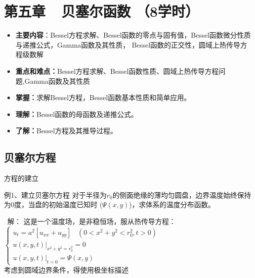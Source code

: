 
\renewcommand{\thechapter}{}
\chapter{第五章~~贝塞尔函数 （8学时）}
\renewcommand{\thechapter}{5}

\begin{itemize}
\item \textbf{主要内容}：Bessel方程求解、Bessel函数的零点与固有值，Bessel函数微分性质与递推公式，Gamma函数及其性质， Bessel函数的正交性，圆域上热传导方程级数解
\item \textbf{重点和难点：}Bessel方程求解、Bessel函数性质、圆域上热传导方程问题,Gamma函数及其性质
\item \textbf{掌握：}求解Bessel方程，Bessel函数基本性质和简单应用。
\item \textbf{理解：}Bessel函数的母函数及递推公式。
\item \textbf{了解：}Bessel方程及其推导过程。
\end{itemize}

\section{贝塞尔方程}


	{方程的建立}
	\begin{example} {例1、建立贝塞尔方程}
		对于半径为$r_0$的侧面绝缘的薄均匀圆盘，边界温度始终保持为0度，当盘的初始温度已知时 ($\Psi(x,y)$)，求体系的温度分布函数。
    \end{example}
	\begin{center}
	\end{center}



	{\alert{ 解：}}	这是一个温度场，是非稳恒场，服从热传导方程：\\
	$\begin{cases}
		u_t=a^2 [u_{xx}   +u_{yy}] ~~~~ (0< x^2 +y^2 <r_0 ^2, t>0)\\
		u(x,y,t)|_{x^2+y^2=r_0 ^2}= 0 \\
		u(x,y,t)|_{t=0}= \Psi(x,y)
	\end{cases} $\\	\vspace{0.6em}
	考虑到圆域边界条件，得使用极坐标描述\\



